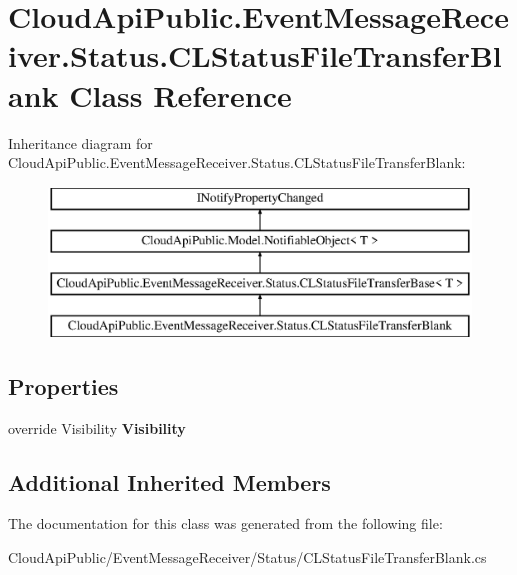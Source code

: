 \hypertarget{class_cloud_api_public_1_1_event_message_receiver_1_1_status_1_1_c_l_status_file_transfer_blank}{\section{Cloud\-Api\-Public.\-Event\-Message\-Receiver.\-Status.\-C\-L\-Status\-File\-Transfer\-Blank Class Reference}
\label{class_cloud_api_public_1_1_event_message_receiver_1_1_status_1_1_c_l_status_file_transfer_blank}
}
Inheritance diagram for Cloud\-Api\-Public.\-Event\-Message\-Receiver.\-Status.\-C\-L\-Status\-File\-Transfer\-Blank\-:\begin{figure}[H]
\begin{center}
\leavevmode
\includegraphics[height=4.000000cm]{class_cloud_api_public_1_1_event_message_receiver_1_1_status_1_1_c_l_status_file_transfer_blank}
\end{center}
\end{figure}
\subsection*{Properties}
\begin{DoxyCompactItemize}
\item 
\hypertarget{class_cloud_api_public_1_1_event_message_receiver_1_1_status_1_1_c_l_status_file_transfer_blank_a8bd423be27f802d5c0be2894746bbaae}{override Visibility {\bfseries Visibility}}\label{class_cloud_api_public_1_1_event_message_receiver_1_1_status_1_1_c_l_status_file_transfer_blank_a8bd423be27f802d5c0be2894746bbaae}

\end{DoxyCompactItemize}
\subsection*{Additional Inherited Members}


The documentation for this class was generated from the following file\-:\begin{DoxyCompactItemize}
\item 
Cloud\-Api\-Public/\-Event\-Message\-Receiver/\-Status/C\-L\-Status\-File\-Transfer\-Blank.\-cs\end{DoxyCompactItemize}
